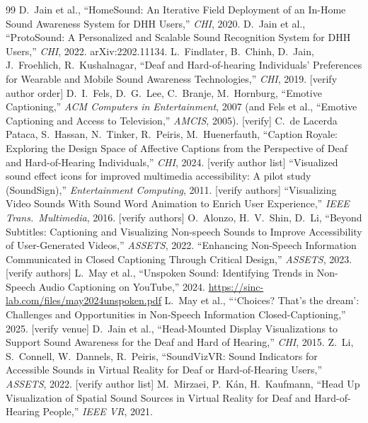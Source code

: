 \documentclass[11pt,a4paper]{article}
\begin{document}
\begin{thebibliography}{99}
 D.\ Jain et al., ``HomeSound: An Iterative Field Deployment of an In-Home Sound Awareness System for DHH Users,'' \emph{CHI}, 2020.
 D.\ Jain et al., ``ProtoSound: A Personalized and Scalable Sound Recognition System for DHH Users,'' \emph{CHI}, 2022. arXiv:2202.11134.
 L.\ Findlater, B.\ Chinh, D.\ Jain, J.\ Froehlich, R.\ Kushalnagar, ``Deaf and Hard-of-hearing Individuals' Preferences for Wearable and Mobile Sound Awareness Technologies,'' \emph{CHI}, 2019. [verify author order]
 D.\ I.\ Fels, D.\ G.\ Lee, C.\ Branje, M.\ Hornburg, ``Emotive Captioning,'' \emph{ACM Computers in Entertainment}, 2007 (and Fels et al., ``Emotive Captioning and Access to Television,'' \emph{AMCIS}, 2005). [verify]
 C.\ de Lacerda Pataca, S.\ Hassan, N.\ Tinker, R.\ Peiris, M.\ Huenerfauth, ``Caption Royale: Exploring the Design Space of Affective Captions from the Perspective of Deaf and Hard-of-Hearing Individuals,'' \emph{CHI}, 2024. [verify author list]
 ``Visualized sound effect icons for improved multimedia accessibility: A pilot study (SoundSign),'' \emph{Entertainment Computing}, 2011. [verify authors]
 ``Visualizing Video Sounds With Sound Word Animation to Enrich User Experience,'' \emph{IEEE Trans.\ Multimedia}, 2016. [verify authors]
 O.\ Alonzo, H.\ V.\ Shin, D.\ Li, ``Beyond Subtitles: Captioning and Visualizing Non-speech Sounds to Improve Accessibility of User-Generated Videos,'' \emph{ASSETS}, 2022.
 ``Enhancing Non-Speech Information Communicated in Closed Captioning Through Critical Design,'' \emph{ASSETS}, 2023. [verify authors]
 L.\ May et al., ``Unspoken Sound: Identifying Trends in Non-Speech Audio Captioning on YouTube,'' 2024. \url{https://sinc-lab.com/files/may2024unspoken.pdf}
 L.\ May et al., ```Choices? That's the dream': Challenges and Opportunities in Non-Speech Information Closed-Captioning,'' 2025. [verify venue]
 D.\ Jain et al., ``Head-Mounted Display Visualizations to Support Sound Awareness for the Deaf and Hard of Hearing,'' \emph{CHI}, 2015.
 Z.\ Li, S.\ Connell, W.\ Dannels, R.\ Peiris, ``SoundVizVR: Sound Indicators for Accessible Sounds in Virtual Reality for Deaf or Hard-of-Hearing Users,'' \emph{ASSETS}, 2022. [verify author list]
 M.\ Mirzaei, P.\ K\'an, H.\ Kaufmann, ``Head Up Visualization of Spatial Sound Sources in Virtual Reality for Deaf and Hard-of-Hearing People,'' \emph{IEEE VR}, 2021.

\end{thebibliography}
\end{document}
